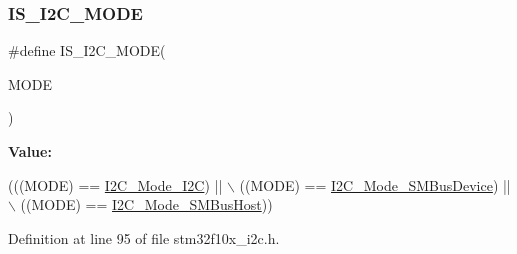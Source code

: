 \subsubsection{\texorpdfstring{I\+S\+\_\+\+I2\+C\+\_\+\+M\+O\+DE}{IS\_I2C\_MODE}}
{\footnotesize\ttfamily \#define I\+S\+\_\+\+I2\+C\+\_\+\+M\+O\+DE(\begin{DoxyParamCaption}\item[{}]{M\+O\+DE }\end{DoxyParamCaption})}

{\bfseries Value\+:}
\begin{DoxyCode}
(((MODE) == \hyperlink{group___i2_c__mode_ga8bc3b0555ca31b6f8423bc2ada45d1ac}{I2C\_Mode\_I2C}) || \(\backslash\)
                           ((MODE) == \hyperlink{group___i2_c__mode_gaf0cf66bc1f4986ba8a9925da924e06da}{I2C\_Mode\_SMBusDevice}) || \(\backslash\)
                           ((MODE) == \hyperlink{group___i2_c__mode_gacfd37619c8d91dea5dec2921840acede}{I2C\_Mode\_SMBusHost}))
\end{DoxyCode}


Definition at line 95 of file stm32f10x\+\_\+i2c.\+h.

